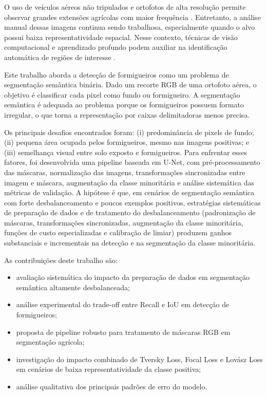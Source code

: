 \documentclass[10pt,a4paper,twocolumn]{article}
\begin{document}
O uso de veículos aéreos não tripulados e ortofotos de alta resolução permite observar grandes extensões agrícolas com maior frequência \cite{tsouros2019}. Entretanto, a análise manual dessas imagens continua sendo trabalhosa, especialmente quando o alvo possui baixa representatividade espacial. Nesse contexto, técnicas de visão computacional e aprendizado profundo podem auxiliar na identificação automática de regiões de interesse \cite{kamilaris2018}.

Este trabalho aborda a detecção de formigueiros como um problema de segmentação semântica binária. Dado um recorte RGB de uma ortofoto aérea, o objetivo é classificar cada pixel como fundo ou formigueiro. A segmentação semântica é adequada ao problema porque os formigueiros possuem formato irregular, o que torna a representação por caixas delimitadoras menos precisa.

Os principais desafios encontrados foram: (i) predominância de pixels de fundo; (ii) pequena área ocupada pelos formigueiros, mesmo nas imagens positivas; e (iii) semelhança visual entre solo exposto e formigueiros. Para enfrentar esses fatores, foi desenvolvida uma pipeline baseada em U-Net, com pré-processamento das máscaras, normalização das imagens, transformações sincronizadas entre imagem e máscara, augmentação da classe minoritária e análise sistemática das métricas de validação.
A hipótese é que, em cenários de segmentação semântica com forte desbalanceamento e poucos exemplos positivos, estratégias sistemáticas de preparação de dados e de tratamento do desbalanceamento (padronização de máscaras, transformações sincronizadas, augmentação da classe minoritária, funções de custo especializadas e calibração de limiar) produzem ganhos substanciais e incrementais na detecção e na segmentação da classe minoritária.

As contribuições deste trabalho são:

\begin{itemize}
    \item avaliação sistemática do impacto da preparação de dados em segmentação semântica altamente desbalanceada;

    \item análise experimental do trade-off entre Recall e IoU em detecção de formigueiros;

    \item proposta de pipeline robusto para tratamento de máscaras RGB em segmentação agrícola;

    \item investigação do impacto combinado de Tversky Loss, Focal Loss e Lovász Loss em cenários de baixa representatividade da classe positiva;

    \item análise qualitativa dos principais padrões de erro do modelo.
\end{itemize}
\end{document}
